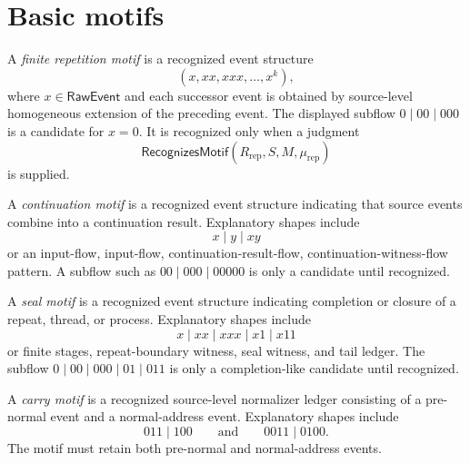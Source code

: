 \section{Basic motifs}
\label{sec:motif-report-basic-motifs}

\begin{definition}
\label{def:motif-report-finite-repetition}
A \emph{finite repetition motif} is a recognized event structure
$$
  (x,xx,xxx,\ldots,x^k),
$$
where $x\in\mathsf{RawEvent}$ and each successor event is obtained by source-level homogeneous extension of the preceding event. The displayed subflow $0\mid 00\mid 000$ is a candidate for $x=0$. It is recognized only when a judgment
$$
  \mathsf{RecognizesMotif}(R_{\mathrm{rep}},S,M,\mu_{\mathrm{rep}})
$$
is supplied.
\end{definition}

\begin{definition}
\label{def:motif-report-continuation}
A \emph{continuation motif} is a recognized event structure indicating that source events combine into a continuation result. Explanatory shapes include
$$
  x\mid y\mid xy
$$
or an input-flow, input-flow, continuation-result-flow, continuation-witness-flow pattern. A subflow such as $00\mid 000\mid 00000$ is only a candidate until recognized.
\end{definition}

\begin{definition}
\label{def:motif-report-seal}
A \emph{seal motif} is a recognized event structure indicating completion or closure of a repeat, thread, or process. Explanatory shapes include
$$
  x\mid xx\mid xxx\mid x1\mid x11
$$
or finite stages, repeat-boundary witness, seal witness, and tail ledger. The subflow $0\mid 00\mid 000\mid 01\mid 011$ is only a completion-like candidate until recognized.
\end{definition}

\begin{definition}
\label{def:motif-report-carry}
A \emph{carry motif} is a recognized source-level normalizer ledger consisting of a pre-normal event and a normal-address event. Explanatory shapes include
$$
  011\mid 100
  \qquad\text{and}\qquad
  0011\mid 0100.
$$
The motif must retain both pre-normal and normal-address events.
\end{definition}


